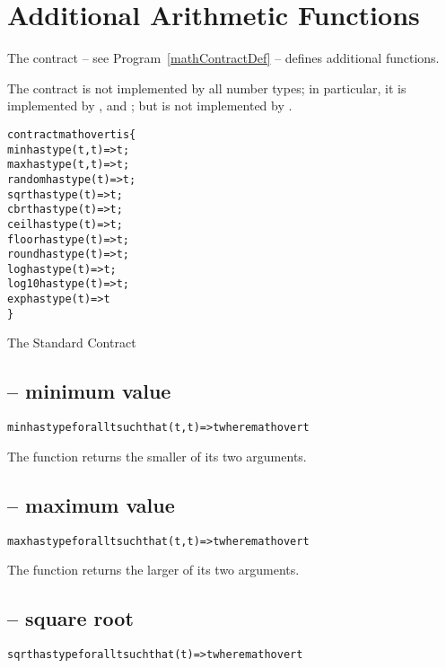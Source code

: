 \section{Additional Arithmetic Functions}
\label{mathContract}
The  contract -- see Program~\vref{mathContractDef} -- defines additional functions.

\begin{aside}
The  contract is not implemented by all number types; in particular, it is implemented by ,  and ; but is not implemented by .
\end{aside}

\begin{program}
\begin{alltt}
contract math over t is \{
  min has type (t,t)=>t;
  max has type (t,t)=>t;
  random has type (t)=>t;
  sqrt has type (t)=>t;
  cbrt has type (t)=>t;
  ceil has type (t)=>t;
  floor has type (t)=>t;
  round has type (t)=>t;
  log has type (t)=>t;
  log10 has type (t)=>t;
  exp has type (t)=>t
\}
\end{alltt}
\caption{The Standard  Contract\label{mathContractDef}}
\end{program}

\subsection{ -- minimum value}
\begin{alltt}
min has type for all t such that (t,t)=>t where math over t
\end{alltt}

The  function returns the smaller of its two arguments.

\subsection{ -- maximum value}
\begin{alltt}
max has type for all t such that (t,t)=>t where math over t
\end{alltt}

The  function returns the larger of its two arguments.

\subsection{ -- square root}
\begin{alltt}
sqrt has type for all t such that (t)=>t where math over t
\end{alltt}

